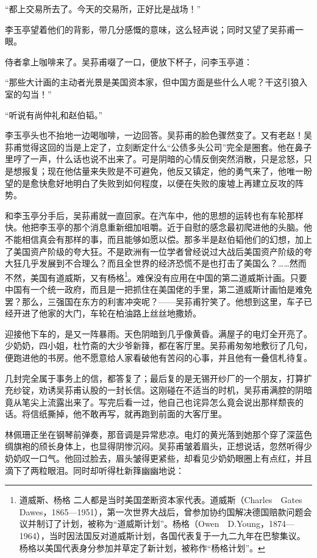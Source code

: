 \par “都上交易所去了。今天的交易所，正好比是战场！”
\par 李玉亭望着他们的背影，带几分感慨的意味，这么轻声说；同时又望了吴荪甫一眼。
\par 侍者拿上咖啡来了。吴荪甫啜了一口，便放下杯子，问李玉亭道：
\par “那些大计画的主动者光景是美国资本家，但中国方面是些什么人呢？干这引狼入室的勾当！”
\par “听说有尚仲礼和赵伯韬。”
\par 李玉亭头也不抬地一边喝咖啡，一边回答。吴荪甫的脸色骤然变了。又有老赵！吴荪甫觉得这回的当是上定了，立刻断定什么“公债多头公司”完全是圈套。他在鼻子里哼了一声，什么话也说不出来了。可是阴暗的心情反倒突然消散，只是忿怒，只是想报复；现在他估量来失败是不可避免，他反又镇定，他的勇气来了，他唯一盼望的是愈快愈好地明白了失败到如何程度，以便在失败的废墟上再建立反攻的阵势。
\par 和李玉亭分手后，吴荪甫就一直回家。在汽车中，他的思想的运转也有车轮那样快。他把李玉亭的那个消息重新细加咀嚼。近于自慰的感念最初爬进他的头脑。他不能相信真会有那样的事，而且能够如愿以偿。那多半是赵伯韬他们的幻想，加上了美国资产阶级的夸大狂。不是欧洲有一位学者曾经说过大战后美国资产阶级的夸大狂几乎发展到不合理么？而且全世界的经济恐慌不是也打击了美国么？……然而不然，美国有道威斯，又有杨格\footnote{道威斯、杨格 二人都是当时美国垄断资本家代表。道威斯（Charles　Gates Dawes，1865—1951），第一次世界大战后，曾参加协约国解决德国赔款问题会议并制订了计划，被称为“道威斯计划”。杨格（Owen　D.Young，1874—1964），当时因法国反对道威斯计划，各国代表复于一九二九年在巴黎集议。杨格以美国代表身分参加并草定了新计划，被称作“杨格计划”。}。难保没有应用在中国的第二道威斯计画。只要中国有一个统一政府，而且是一把抓住在美国佬的手里，第二道威斯计画怕是难免罢？那么，三强国在东方的利害冲突呢？——吴荪甫狞笑了。他想到这里，车子已经开进了他家的大门，车轮在柏油路上丝丝地撒娇。
\par 迎接他下车的，是又一阵暴雨。天色阴暗到几乎像黄昏。满屋子的电灯全开亮了。少奶奶，四小姐，杜竹斋的大少爷新箨，都在客厅里。吴荪甫匆匆地敷衍了几句，便跑进他的书房。他不愿意给人家看破他有苦闷的心事，并且他有一叠信札待复。
\par 几封完全属于事务上的信，都答复了；最后复的是无锡开纱厂的一个朋友，打算扩充纱锭，劝诱吴荪甫认股的一封长信。这刚碰在不适当的时机，吴荪甫满腔的阴暗竟从笔尖上流露出来了。写完后看一过，他自己也诧异怎么竟会说出那样颓丧的话。将信纸撕掉，他不敢再写，就再跑到前面的大客厅里。
\par 林佩珊正坐在钢琴前弹奏，那音调是异常悲凉。电灯的黄光落到她那个穿了深蓝色绸旗袍的颀长身体上，也显得阴惨沉闷。吴荪甫皱着眉头，正想说话，忽然听得少奶奶叹一口气。他回过脸去，眉头皱得更紧些，却看见少奶奶眼圈上有点红，并且滴下了两粒眼泪。同时却听得杜新箨幽幽地说：
